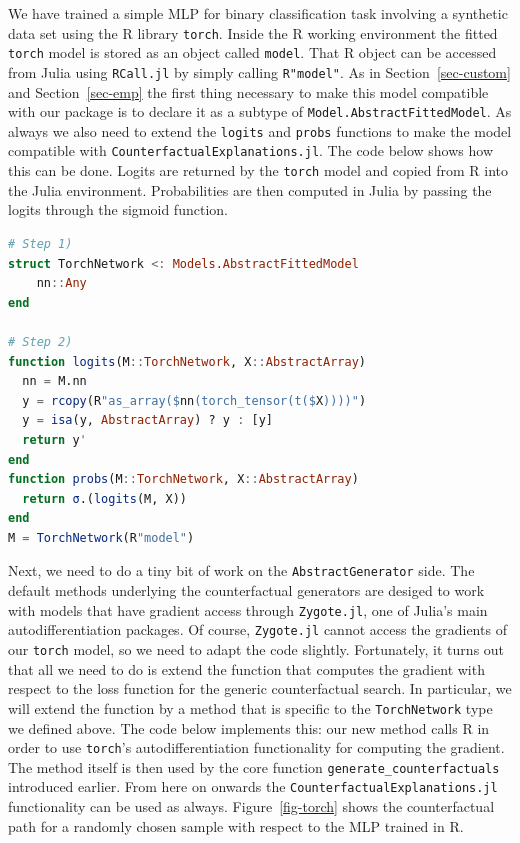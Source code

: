 \documentclass{juliacon}
\begin{document}
We have trained a simple MLP for binary classification task involving a
synthetic data set using the R library \texttt{torch}. Inside the R
working environment the fitted \texttt{torch} model is stored as an
object called \texttt{model}. That R object can be accessed from Julia
using \texttt{RCall.jl} by simply calling \texttt{R"model"}. As in
Section~\ref{sec-custom} and Section~\ref{sec-emp} the first thing
necessary to make this model compatible with our package is to declare
it as a subtype of \texttt{Model.AbstractFittedModel}. As always we also
need to extend the \texttt{logits} and \texttt{probs} functions to make
the model compatible with \texttt{CounterfactualExplanations.jl}. The
code below shows how this can be done. Logits are returned by the
\texttt{torch} model and copied from R into the Julia environment.
Probabilities are then computed in Julia by passing the logits through
the sigmoid function.

\begin{lstlisting}[language=Julia]
# Step 1)
struct TorchNetwork <: Models.AbstractFittedModel
    nn::Any
end

# Step 2)
function logits(M::TorchNetwork, X::AbstractArray)
  nn = M.nn
  y = rcopy(R"as_array($nn(torch_tensor(t($X))))")
  y = isa(y, AbstractArray) ? y : [y]
  return y'
end
function probs(M::TorchNetwork, X::AbstractArray)
  return σ.(logits(M, X))
end
M = TorchNetwork(R"model")
\end{lstlisting}

Next, we need to do a tiny bit of work on the \texttt{AbstractGenerator}
side. The default methods underlying the counterfactual generators are
desiged to work with models that have gradient access through
\texttt{Zygote.jl}, one of Julia's main autodifferentiation packages. Of
course, \texttt{Zygote.jl} cannot access the gradients of our
\texttt{torch} model, so we need to adapt the code slightly.
Fortunately, it turns out that all we need to do is extend the function
that computes the gradient with respect to the loss function for the
generic counterfactual search. In particular, we will extend the
function by a method that is specific to the \texttt{TorchNetwork} type
we defined above. The code below implements this: our new method calls R
in order to use \texttt{torch}'s autodifferentiation functionality for
computing the gradient. The method itself is then used by the core
function \texttt{generate\_counterfactuals} introduced earlier. From
here on onwards the \texttt{CounterfactualExplanations.jl} functionality
can be used as always. Figure~\ref{fig-torch} shows the counterfactual
path for a randomly chosen sample with respect to the MLP trained in R.
\end{document}
